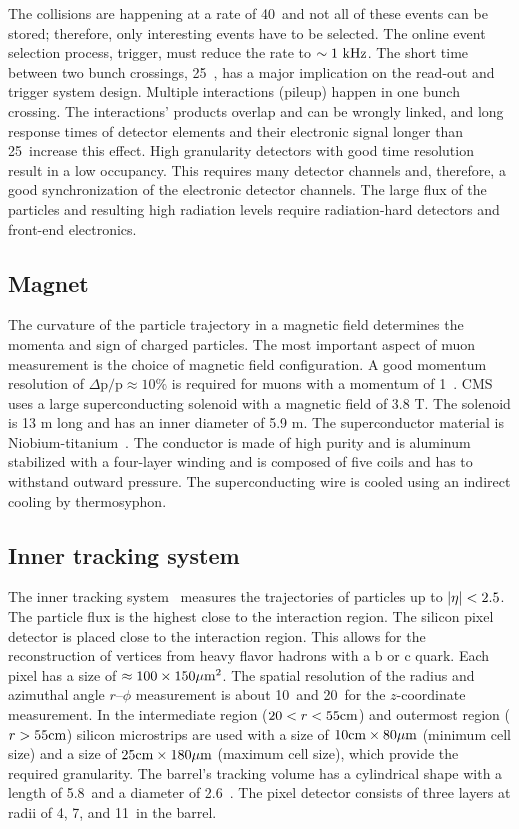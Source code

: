 The collisions are happening at a rate of 40~\mhz and not all of these events can be stored; therefore, only interesting events have to be selected. The online event selection process, trigger, must reduce the rate to $\sim 1~\text{kHz}$. The short time between two bunch crossings, 25~\ns, has a major implication on the read-out and trigger system design. Multiple \pp interactions (pileup) happen in one bunch crossing. The interactions' products overlap and can be wrongly linked, and long response times of detector elements and their electronic signal longer than 25~\ns increase this effect. High granularity detectors with good time resolution result in a low occupancy. This requires many detector channels and, therefore, a good synchronization of the electronic detector channels. The large flux of the particles and resulting high radiation levels require radiation-hard detectors and front-end electronics.

\subsection{Magnet}

The curvature of the particle trajectory in a magnetic field determines the momenta and sign of charged particles. The most important aspect of muon measurement is the choice of magnetic field configuration. A good momentum resolution of $\Delta \text{p} / \text{p} \approx 10 \%$ is required for muons with a momentum of 1~\TeV. CMS uses a large superconducting solenoid with a magnetic field of 3.8 T. The solenoid is 13 m long and has an inner diameter of 5.9 m. The superconductor material is Niobium-titanium~\cite{BUL-NA-2003-150}. The conductor is made of high purity and is aluminum stabilized with a four-layer winding and is composed of five coils and has to withstand outward pressure. The superconducting wire is cooled using an indirect cooling by thermosyphon.

\subsection{Inner tracking system}

The inner tracking system~\cite{Khachatryan:2010pw} measures the trajectories of particles up to $\lvert\eta\rvert < 2.5$. The particle flux is the highest close to the interaction region. The silicon pixel detector is placed close to the interaction region. This allows for the reconstruction of vertices from heavy flavor hadrons with a b or c quark. Each pixel has a size of $\approx 100 \times 150 \mu \text{m}^{2}$. The spatial resolution of the radius and azimuthal angle $r$--$\phi$ measurement is about 10~\mum and 20~\mum for the $z$-coordinate measurement. In the intermediate region ($20 < r < 55 \text{cm}$) and outermost region ($r > 55 \text{cm}$) silicon microstrips are used with a size of $10 \text{cm} \times 80 \mu \text{m}$ (minimum cell size) and a size of $25 \text{cm} \times 180 \mu \text{m}$ (maximum cell size), which provide the required granularity. The barrel's tracking volume has a cylindrical shape with a length of 5.8~\m and a diameter of 2.6~\m. The pixel detector consists of three layers at radii of 4, 7, and 11~\cm in the barrel.

